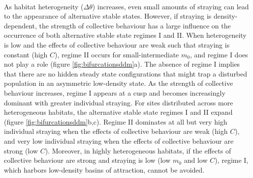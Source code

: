 \documentclass{revtex4}
\begin{document}
\\
As habitat heterogeneity ($\Delta\theta$) increases, even small amounts of straying can lead to the appearance of alternative stable states. %
However, if straying is density-dependent, the strength of collective behaviour has a large influence on the occurrence of both alternative stable state regimes I and II.
When heterogeneity is low and the effects of collective behaviour are weak such that straying is constant (high $C$), regime II occurs for small-intermediate $m_0$, and regime I does not play a role (figure \ref{fig:bifurcationsddm}a). %
The absence of regime I implies that there are no hidden steady state configurations that might trap a disturbed population in an asymmetric low-density state.
As the strength of collective behaviour increases, regime I appears at a cusp and becomes increasingly dominant with greater individual straying.
For sites distributed across more heterogeneous habitats, the alternative stable state regimes I and II expand (figure \ref{fig:bifurcationsddm}b,c).
Regime II dominates at all but very high individual straying when the effects of collective behaviour are weak (high $C$), and very low individual straying when the effects of collective behaviour are strong (low $C$).
Moreover, in highly heterogeneous habitats, if the effects of collective behaviour are strong and straying is low (low $m_0$ and low $C$), regime I, which harbors low-density basins of attraction, cannot be avoided.
\end{document}
